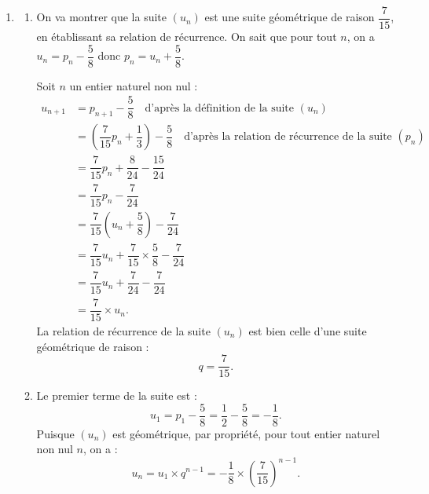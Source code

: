 \documentclass[10pt]{article}
\begin{document}
\begin{enumerate}
Les événements $T_n$ et $\overline{T_n}$ partitionnent l'univers, donc, d'après la loi des probabilités totales :
\[
\begin{aligned}
p_{n+1}=P(T_{n+1})&=P(T_n\cap T_{n+1})+P(\overline{T_n}\cap T_{n+1})\\
&=P(T_n)\times P_{T_n}(T_{n+1})+P(\overline{T_n})\times P_{\overline{T_n}}(T_{n+1})
\end{aligned}
\]
\[
\begin{aligned}
p_{n+1}&=p_n\times \dfrac45+(1-p_n)\times \dfrac13\\
&=p_n\times \dfrac45+\dfrac13-p_n\times \dfrac13\\
&=p_n\times \left(\dfrac45-\dfrac13\right)+\dfrac13\\
&=\dfrac7{15}p_n+\dfrac13.
\end{aligned}
\]
On a bien établi la relation de récurrence de la suite $(p_n)$.

\item \begin{enumerate}
\item On va montrer que la suite $(u_n)$ est une suite géométrique de raison $\dfrac7{15}$, en établissant sa relation de récurrence. On sait que pour tout $n$, on a $u_n=p_n-\dfrac58$ donc $p_n=u_n+\dfrac58$.

Soit $n$ un entier naturel non nul :
\[
\begin{aligned}
u_{n+1}&=p_{n+1}-\dfrac58 \quad \text{d'après la définition de la suite }(u_n)\\
&=\left(\dfrac7{15}p_n+\dfrac13\right)-\dfrac58 \quad \text{d'après la relation de récurrence de la suite }(p_n)\\
&=\dfrac7{15}p_n+\dfrac8{24}-\dfrac{15}{24}\\
&=\dfrac7{15}p_n-\dfrac7{24}\\
&=\dfrac7{15}\left(u_n+\dfrac58\right)-\dfrac7{24}\\
&=\dfrac7{15}u_n+\dfrac7{15}\times \dfrac58-\dfrac7{24}\\
&=\dfrac7{15}u_n+\dfrac7{24}-\dfrac7{24}\\
&=\dfrac7{15}\times u_n.
\end{aligned}
\]
La relation de récurrence de la suite $(u_n)$ est bien celle d'une suite géométrique de raison :
\[
q=\dfrac7{15}.
\]

\item Le premier terme de la suite est :
\[
u_1=p_1-\dfrac58=\dfrac12-\dfrac58=-\dfrac18.
\]
Puisque $(u_n)$ est géométrique, par propriété, pour tout entier naturel non nul $n$, on a :
\[
u_n=u_1\times q^{n-1}=-\dfrac18\times \left(\dfrac7{15}\right)^{n-1}.
\]


\end{enumerate}
\end{enumerate}
\end{document}
